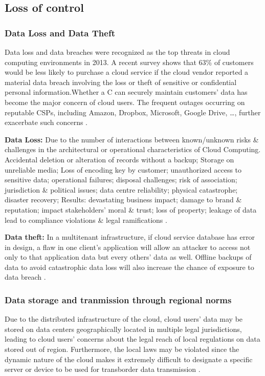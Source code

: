 \documentclass{ijitcs}
\begin{document}
\subsection{Loss of control}
\subsubsection{Data Loss and Data Theft}
Data loss and data breaches were recognized as the top threats in cloud computing environments in 2013. A recent survey shows that 63\% of customers would be less likely to purchase a cloud service if the cloud vendor reported a material data breach involving the loss or theft of sensitive or confidential personal information.Whether a C can securely maintain customers’ data has become the major concern of cloud users. The frequent outages occurring on reputable CSPs, including Amazon, Dropbox, Microsoft, Google Drive, \dots, further exacerbate such concerns \cite{liu2015survey}.

\textbf{Data Loss:} Due to the number of interactions between known/unknown risks \& challenges in the architectural or operational characteristics of Cloud Computing. Accidental deletion or alteration of records without a backup; Storage on unreliable media; Loss of encoding key by customer; unauthorized access to sensitive data; operational failures; disposal challenges; risk of association; jurisdiction \& political issues; data centre reliability; physical catastrophe; disaster recovery; Results: devastating business impact; damage to brand \& reputation; impact stakeholders’ moral \& trust; loss of property; leakage of data lead to compliance violations \& legal ramifications \cite{ahmad2017cloud}.

\textbf{Data theft:} In a multitenant infrastructure, if cloud service database has error in design, a flaw in one client’s application will allow an attacker to access not only to that application data but every others’ data as well. Offline backups of data to avoid catastrophic data loss will also increase the chance of exposure to data breach \cite{ahmad2017cloud}.

\subsubsection{Data storage and tranmission through regional norms}
Due to the distributed infrastructure of the cloud, cloud users’ data may be stored on data centers geographically located in multiple legal jurisdictions, leading to cloud users’ concerns about the legal reach of local regulations on data stored out of region. Furthermore, the local laws may be violated since the dynamic nature of the cloud makes it extremely difficult to designate a specific server or device to be used for transborder data transmission \cite{liu2015survey}.
\end{document}
